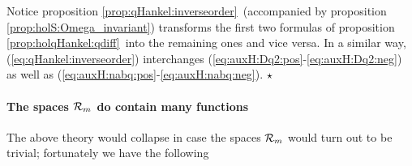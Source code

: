 \begin{remark} \rm
Notice proposition \ref{prop:qHankel:inverseorder}\ (accompanied
by proposition \ref{prop:holS:Omega_invariant}) transforms the
first two formulas of proposition \ref{prop:holqHankel:qdiff}\
into the remaining ones and vice versa. In a similar way,
(\ref{eq:qHankel:inverseorder}) interchanges
(\ref{eq:auxH:Dq2:pos}-\ref{eq:auxH:Dq2:neg}) as well as
(\ref{eq:auxH:nabq:pos}-\ref{eq:auxH:nabq:neg}).
$\hfill \star$
\end{remark}



\paragraph{The spaces ${\mathcal R}_{m}$ do contain many functions}
The above theory would collapse in case the spaces ${\mathcal R}_{m}$ would
turn out to be trivial; fortunately we have the following

